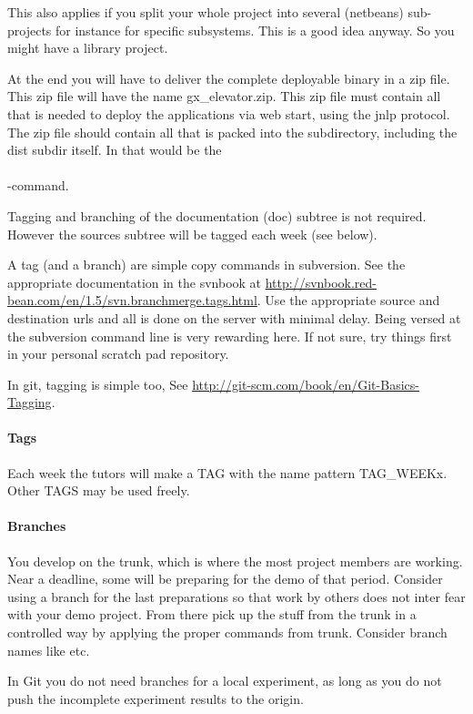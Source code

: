 This also applies if you split your whole project into several
(netbeans) sub-projects for instance for specific subsystems. This is
a good idea anyway. So you might have a  library
project.

At the end you will have to deliver the complete deployable binary in
a zip file. This zip file will have the name gx\_elevator.zip. This
zip file must contain all that is needed to deploy the applications
via web start, using the jnlp protocol. The zip file should contain all
that is packed into the  subdirectory, including the dist
subdir itself. In \Linux that would be the \\
\\
-command.

Tagging and branching of the documentation (doc) subtree is not required.
However the sources subtree will be tagged each week (see below).

A tag (and a branch) are simple copy commands in subversion. See the
appropriate documentation in the svnbook at
\url{http://svnbook.red-bean.com/en/1.5/svn.branchmerge.tags.html}. Use
the appropriate source and destination urls and all is done on the
server with minimal delay. Being versed at the subversion command line
is very rewarding here. If not sure, try things first in your
personal scratch pad repository.

In git, tagging is simple too, See \url{http://git-scm.com/book/en/Git-Basics-Tagging}.

\paragraph{Tags} Each week the tutors will make a TAG with the name
pattern TAG\_WEEKx. Other TAGS may be used freely.

\paragraph{Branches} You develop on the trunk, which is where the most
project members are working. Near a deadline, some will be preparing
for the demo of that period. Consider using a branch for the last
preparations so that work by others does not inter fear with your demo
project. From there pick up the stuff from the trunk in a controlled
way by applying the proper  commands from trunk.
Consider branch names like  etc.

In Git you do not need branches for a local experiment, as long as you
do not push the incomplete experiment results to the origin.


